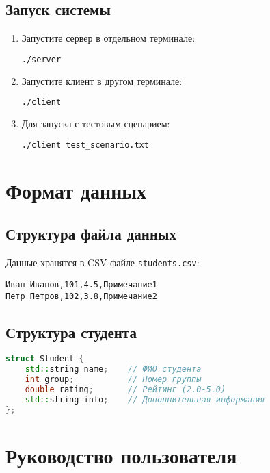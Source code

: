 \documentclass[a4paper,12pt]{article}
\begin{document}
\subsection{Запуск системы}
\begin{enumerate}
\item Запустите сервер в отдельном терминале:
\begin{lstlisting}[language=bash]
./server
\end{lstlisting}

\item Запустите клиент в другом терминале:
\begin{lstlisting}[language=bash]
./client
\end{lstlisting}

\item Для запуска с тестовым сценарием:
\begin{lstlisting}[language=bash]
./client test_scenario.txt
\end{lstlisting}
\end{enumerate}

\section{Формат данных}
\subsection{Структура файла данных}
Данные хранятся в CSV-файле \texttt{students.csv}:
\begin{lstlisting}
Иван Иванов,101,4.5,Примечание1
Петр Петров,102,3.8,Примечание2
\end{lstlisting}

\subsection{Структура студента}
\begin{lstlisting}[language=C++]
struct Student {
    std::string name;    // ФИО студента
    int group;           // Номер группы
    double rating;       // Рейтинг (2.0-5.0)
    std::string info;    // Дополнительная информация
};
\end{lstlisting}

\section{Руководство пользователя}
\end{document}

